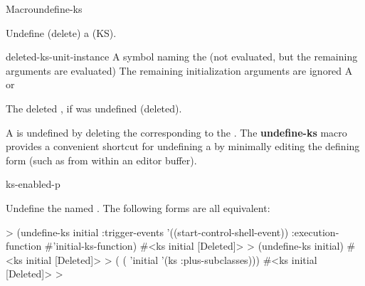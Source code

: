 \documentclass[10pt,twoside,english,pdftex]{article}
\begin{document}
\begin{functiondoc}{Macro}{undefine-ks}{
      
    \returns{} }
%
%
%

\fnsyntax

\fnpurpose Undefine (delete) a  (KS).

\fnpackage {}

\fnmodule {}

\fnargs
\begin{args}{deleted-ks-unit-instance}
\arg[ks-name] A symbol naming the  (not evaluated, but the remaining
arguments are evaluated)
 The remaining initialization arguments are ignored
 A   or \nil{}
\end{args}

\fnreturns The deleted  , if
  was undefined (deleted).

\fndescription A  is undefined by deleting the 
corresponding to the .  The \textbf{undefine-ks} macro provides a
convenient shortcut for undefining a  by minimally editing the
defining form (such as from within an editor buffer).

\begin{alsos}{ks-enabled-p}
\also[define-ks]
\also[ks-enabled-p]
\end{alsos}

\fnexamples
Undefine the  named . The following forms are all
equivalent:
%
\W\supp
\begin{example}
  > (undefine-ks initial
       :trigger-events '((start-control-shell-event)) 
       :execution-function #'initial-ks-function)
  #<ks initial [Deleted]>\goodpagebreak
  > (undefine-ks initial)
  #<ks initial [Deleted]>\goodpagebreak
  > ( 
       ( 'initial '(ks :plus-subclasses)))
  #<ks initial [Deleted]>
  >
\end{example}

\end{functiondoc}

\end{document}
